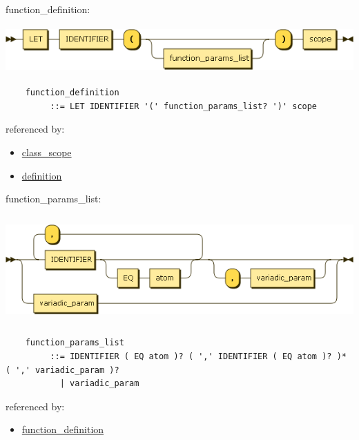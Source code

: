 \begin{minipage}{\textwidth}
    \protect\hypertarget{function_definition}{}{function\_definition:}

    \includegraphics[width=5.97917in,height=0.70833in]{diagram/function_definition.png}

    \begin{verbatim}
    function_definition
         ::= LET IDENTIFIER '(' function_params_list? ')' scope
    \end{verbatim}

    referenced by:

    \begin{itemize}
            \tightlist
        \item
            \protect\hyperlink{class_scope}{class\_scope}
        \item
            \protect\hyperlink{definition}{definition}
    \end{itemize}

\end{minipage}

\begin{minipage}{\textwidth}
    \protect\hypertarget{function_params_list}{}{function\_params\_list:}

    \includegraphics[width=6.31250in,height=1.62500in]{diagram/function_params_list.png}

    \begin{verbatim}
    function_params_list
         ::= IDENTIFIER ( EQ atom )? ( ',' IDENTIFIER ( EQ atom )? )* ( ',' variadic_param )?
           | variadic_param
    \end{verbatim}

    referenced by:

    \begin{itemize}
            \tightlist
        \item
            \protect\hyperlink{function_definition}{function\_definition}
    \end{itemize}

\end{minipage}


